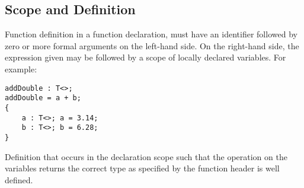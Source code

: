 \subsection{Scope and Definition}
Function definition in a function declaration, must have an
identifier followed by zero or more formal arguments on the left-hand side. On
the right-hand side, the expression given may be followed by a scope of locally
declared variables. For example:
\begin{lstlisting}
addDouble : T<>; 
addDouble = a + b; 
{ 
    a : T<>; a = 3.14;
    b : T<>; b = 6.28;
}
\end{lstlisting}
Definition that occurs in the declaration scope such that the operation 
on the variables returns the correct type as specified by the function header
is well defined.
